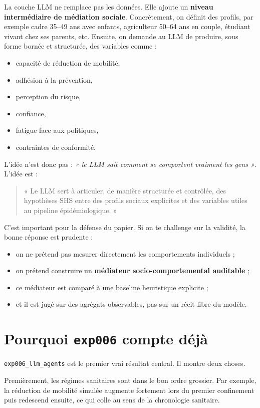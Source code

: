 \documentclass[11pt,a4paper]{article}
\begin{document}
La couche LLM ne remplace pas les données. Elle ajoute un \textbf{niveau intermédiaire de médiation sociale}. Concrètement, on définit des profils, par exemple cadre 35--49 ans avec enfants, agriculteur 50--64 ans en couple, étudiant vivant chez ses parents, etc. Ensuite, on demande au LLM de produire, sous forme bornée et structurée, des variables comme :
\begin{itemize}
\item capacité de réduction de mobilité,
\item adhésion à la prévention,
\item perception du risque,
\item confiance,
\item fatigue face aux politiques,
\item contraintes de conformité.
\end{itemize}

L'idée n'est donc pas : \emph{« le LLM sait comment se comportent vraiment les gens »}. L'idée est :
\begin{quote}
« Le LLM sert à articuler, de manière structurée et contrôlée, des hypothèses SHS entre des profils sociaux explicites et des variables utiles au pipeline épidémiologique. »
\end{quote}

C'est important pour la défense du papier. Si on te challenge sur la validité, la bonne réponse est prudente :
\begin{itemize}
\item on ne prétend pas mesurer directement les comportements individuels ;
\item on prétend construire un \textbf{médiateur socio-comportemental auditable} ;
\item ce médiateur est comparé à une baseline heuristique explicite ;
\item et il est jugé sur des agrégats observables, pas sur un récit libre du modèle.
\end{itemize}

\section{Pourquoi \texttt{exp006} compte déjà}

\texttt{exp006\_llm\_agents} est le premier vrai résultat central. Il montre deux choses.

Premièrement, les régimes sanitaires sont dans le bon ordre grossier. Par exemple, la réduction de mobilité simulée augmente fortement lors du premier confinement puis redescend ensuite, ce qui colle au sens de la chronologie sanitaire.
\end{document}
